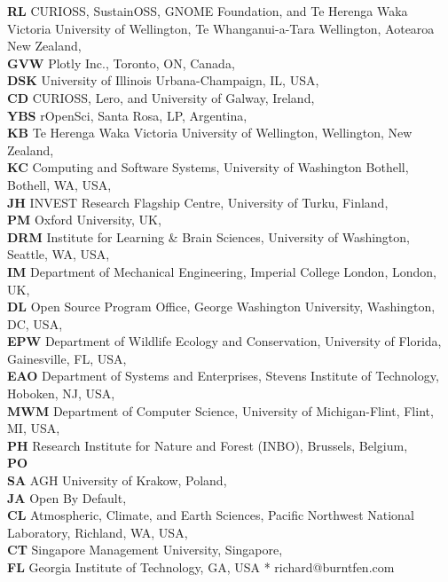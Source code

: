 \documentclass[10pt,letterpaper]{article}
\begin{document}
\begin{flushleft}
\textbf{RL} CURIOSS, SustainOSS, GNOME Foundation, and Te Herenga Waka Victoria University of Wellington, Te Whanganui-a-Tara Wellington, Aotearoa New Zealand, \\
\textbf{GVW} Plotly Inc., Toronto, ON, Canada, \\
\textbf{DSK} University of Illinois Urbana-Champaign, IL, USA, \\
\textbf{CD} CURIOSS, Lero, and University of Galway, Ireland, \\
\textbf{YBS} rOpenSci, Santa Rosa, LP, Argentina, \\
\textbf{KB} Te Herenga Waka Victoria University of Wellington, Wellington, New Zealand, \\
\textbf{KC} Computing and Software Systems, University of Washington Bothell, Bothell, WA, USA, \\
\textbf{JH} INVEST Research Flagship Centre, University of Turku, Finland, \\
\textbf{PM} Oxford University, UK, \\
\textbf{DRM} Institute for Learning \& Brain Sciences, University of Washington, Seattle, WA, USA, \\
\textbf{IM} Department of Mechanical Engineering, Imperial College London, London, UK, \\
\textbf{DL} Open Source Program Office, George Washington University, Washington, DC, USA, \\
\textbf{EPW} Department of Wildlife Ecology and Conservation, University of Florida, Gainesville, FL, USA, \\
\textbf{EAO} Department of Systems and Enterprises, Stevens Institute of Technology, Hoboken, NJ, USA, \\
\textbf{MWM} Department of Computer Science, University of Michigan-Flint, Flint, MI, USA, \\
\textbf{PH} Research Institute for Nature and Forest (INBO), Brussels, Belgium, \\
\textbf{PO} \\
\textbf{SA} AGH University of Krakow, Poland, \\
\textbf{JA} Open By Default, \\
\textbf{CL} Atmospheric, Climate, and Earth Sciences, Pacific Northwest National Laboratory, Richland, WA, USA, \\
\textbf{CT} Singapore Management University, Singapore, \\
\textbf{FL} Georgia Institute of Technology, GA, USA 
* richard@burntfen.com
\end{flushleft}
\end{document}
